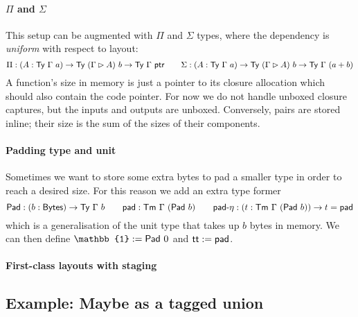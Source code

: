 \paragraph{$\Pi$ and $\Sigma$}\label{function-types}

This setup can be augmented with $\Pi$ and $\Sigma$ types, where the dependency
is \emph{uniform} with respect to layout:
\[
\Pi : (A : \Ty\ \Gamma\ a) \to \Ty\ (\Gamma \rhd A)\ b \to \Ty\ \Gamma\ \ptr \qquad
\Sigma : (A : \Ty\ \Gamma\ a) \to \Ty\ (\Gamma \rhd A)\ b \to \Ty\ \Gamma\ (a + b)
\]
A function's size in memory is just a pointer to its closure allocation which should
also contain the code pointer. For now we do not handle unboxed closure
captures, but the inputs and outputs are unboxed. Conversely, pairs are stored
inline; their size is the sum of the sizes of their components.

\paragraph{Padding type and unit}\label{padding-type-and-unit}

Sometimes we want to store some extra bytes to pad a smaller type in
order to reach a desired size. For this reason we add an extra type
former \[
\syn{Pad} : (b : \Bytes) \to \Ty\ \Gamma\ b \qquad \syn{pad} : \Tm\ \Gamma\ (\syn{Pad}\ b) \qquad
\syn{pad-$\eta$} : (t : \Tm\ \Gamma\ (\syn{Pad}\ b)) \to t = \syn{pad}
\] which is a generalisation of the unit type that takes up \(b\) bytes
in memory. We can then define \(\mathbb{1} := \syn{Pad}\ 0\) and
\(\textsf{tt} := \textsf{pad}\).

\paragraph{First-class layouts with staging}\label{layouts-staging}


\subsection{Example: Maybe as a tagged union}\label{maybe-as-a-tagged-union}


